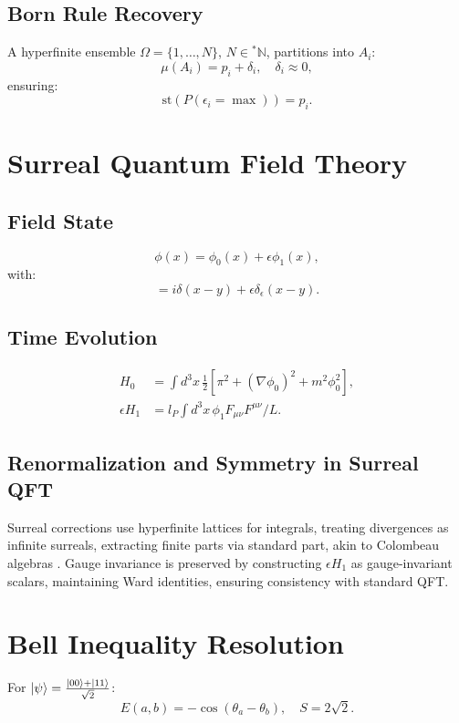 \documentclass{article}
\begin{document}
\subsection{Born Rule Recovery}
A hyperfinite ensemble \(\Omega = \{1, \dots, N\}\), \(N \in {}^*\mathbb{N}\), partitions into \(A_i\):
\begin{equation}
\mu(A_i) = p_i + \delta_i, \quad \delta_i \approx 0,
\end{equation}
ensuring:
\begin{equation}
\text{st}(P(\epsilon_i = \max)) = p_i.
\end{equation}

\section{Surreal Quantum Field Theory}
\subsection{Field State}
\begin{equation}
\phi(x) = \phi_0(x) + \epsilon \phi_1(x),
\end{equation}
with:
\begin{equation}
[\phi(x), \pi(y)] = i \delta(x-y) + \epsilon \delta_\epsilon(x-y).
\end{equation}

\subsection{Time Evolution}
\begin{align}
H_0 &= \int d^3x \, \frac{1}{2} [\pi^2 + (\nabla \phi_0)^2 + m^2 \phi_0^2], \\
\epsilon H_1 &= l_P \int d^3x \, \phi_1 F_{\mu\nu} F^{\mu\nu} / L.
\end{align}

\subsection{Renormalization and Symmetry in Surreal QFT}
Surreal corrections use hyperfinite lattices for integrals, treating divergences as infinite surreals, extracting finite parts via standard part, akin to Colombeau algebras \cite{Grosser2001}. Gauge invariance is preserved by constructing \(\epsilon H_1\) as gauge-invariant scalars, maintaining Ward identities, ensuring consistency with standard QFT.

\section{Bell Inequality Resolution}
For \(\ket{\psi} = \frac{\ket{00} + \ket{11}}{\sqrt{2}}\):
\begin{equation}
E(a,b) = -\cos(\theta_a - \theta_b), \quad S = 2\sqrt{2}.
\end{equation}
\end{document}
